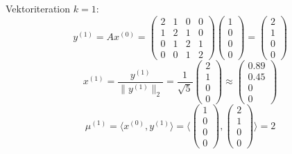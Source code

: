 \begin{example}{Vektoriteration}
    $k = 1$:
    \[
        y^{(1)} = A x^{(0)} =
        \begin{pmatrix}
            2 & 1 & 0 & 0 \\
            1 & 2 & 1 & 0 \\
            0 & 1 & 2 & 1 \\
            0 & 0 & 1 & 2
        \end{pmatrix}
        \begin{pmatrix}
            1 \\ 0 \\ 0 \\ 0
        \end{pmatrix}
        =
        \begin{pmatrix}
            2 \\ 1 \\ 0 \\ 0
        \end{pmatrix}
    \]
    \[
        x^{(1)} = \frac{y^{(1)}}{ \| y^{(1)} \|_2 } = \frac{1}{\sqrt{5}}
        \begin{pmatrix}
            2 \\ 1 \\ 0 \\ 0
        \end{pmatrix}
        \approx
        \begin{pmatrix}
            0.89 \\ 0.45 \\ 0 \\ 0
        \end{pmatrix}
    \]
    \[
        \mu^{(1)} = \langle x^{(0)}, y^{(1)} \rangle = \langle
        \begin{pmatrix}
            1 \\ 0 \\ 0 \\ 0
        \end{pmatrix},
        \begin{pmatrix}
            2 \\ 1 \\ 0 \\ 0
        \end{pmatrix}
        \rangle
        = 2
    \]


\end{example}
